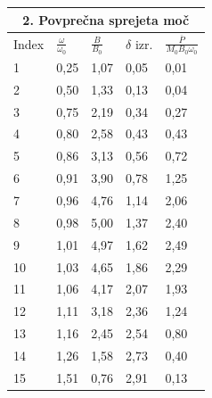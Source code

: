 \begin{tabular}{|p{1.5cm}|p{1.5cm}|p{1.5cm}|p{1.5cm}|p{1.5cm}|}
    \hline
    \multicolumn{5}{|c|}{2. Povprečna sprejeta moč}\\
    \hline
    Index & $\frac{\omega}{\omega_0}$ & $\frac{B}{B_0}$ & $\delta$ izr. & $\frac{\overline{P}}{M_0 B_0 \omega_0}$\\
    \hline
    1 & 0,25 & 1,07 & 0,05 & 0,01\\
    2 & 0,50 & 1,33 & 0,13 & 0,04\\
    3 & 0,75 & 2,19 & 0,34 & 0,27\\
    4 & 0,80 & 2,58 & 0,43 & 0,43\\
    5 & 0,86 & 3,13 & 0,56 & 0,72\\
    6 & 0,91 & 3,90 & 0,78 & 1,25\\
    7 & 0,96 & 4,76 & 1,14 & 2,06\\
    8 & 0,98 & 5,00 & 1,37 & 2,40\\
    9 & 1,01 & 4,97 & 1,62 & 2,49 \\
    10 & 1,03 & 4,65 & 1,86 & 2,29\\
    11 & 1,06 & 4,17 & 2,07 & 1,93\\
    12 & 1,11 & 3,18 & 2,36 & 1,24\\
    13 & 1,16 & 2,45 & 2,54 & 0,80\\
    14 & 1,26 & 1,58 & 2,73 & 0,40\\
    15 & 1,51 & 0,76 & 2,91 & 0,13 \\
    \hline
\end{tabular}
\large\centering
